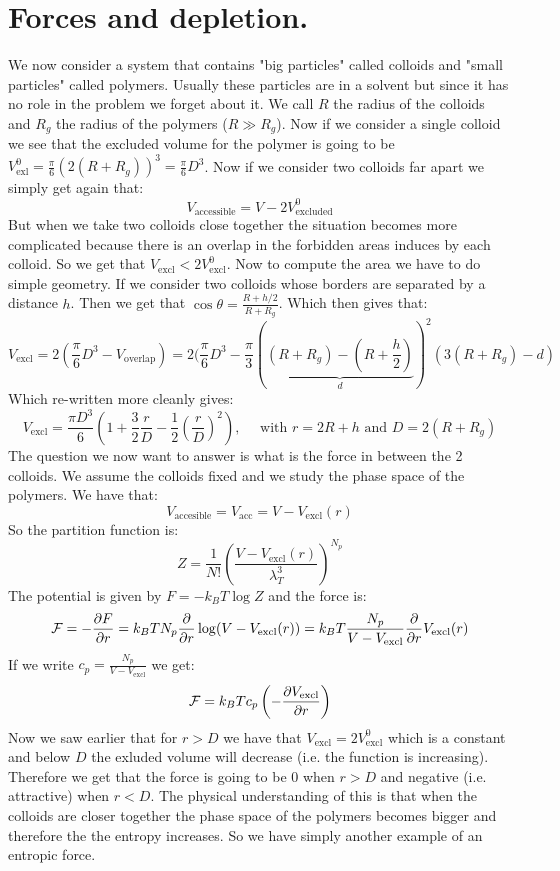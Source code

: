\documentclass[10pt,a4paper]{book}
\begin{document}
\section{Forces and depletion.}
We now consider a system that contains "big particles" called colloids and "small particles" called polymers. Usually these particles are in a solvent but since it has no role in the problem we forget about it. We call $R$ the radius of the colloids and $R_g$ the radius of the polymers ($R \gg R_g$). Now if we consider a single colloid we see that the excluded volume for the polymer is going to be $V_\text{exl}^0 = \frac{\pi}{6} \left(2(R + R_g)\right)^3 = \frac{\pi}{6} D^3$. Now if we consider two colloids far apart we simply get again that:
\[
V_\text{accessible} = V - 2 V_\text{excluded}^0
\]
But when we take two colloids close together the situation becomes more complicated because there is an overlap in the forbidden areas induces by each colloid. So we get that $V_\text{excl} < 2 V_\text{excl}^0$. Now to compute the area we have to do simple geometry. If we consider two colloids whose borders are separated by a distance $h$. Then we get that $\cos \theta = \frac{R + h/2}{R+ R_g}$. Which then gives that:
\[
V_\text{excl} = 2 (\frac{\pi}{6}D^3 - V_\text{overlap}) = 2 (\frac{\pi}{6}D^3 - \frac{\pi}{3} (\underbrace{(R + R_g) - (R + \frac{h}{2})}_{d})^2(3(R+ R_g) - d)
\]
Which re-written more cleanly gives:
\[
V_\text{excl} = \frac{\pi D^3}{6}\left( 1 + \frac{3}{2} \frac{r}{D} - \frac{1}{2} \left(\frac{r}{D}\right)^2\right), \quad \text{ with } r = 2R + h \text{ and } D = 2(R+R_g)
\]
The question we now want to answer is what is the force in between the 2 colloids. We assume the colloids fixed and we study the phase space of the polymers. We have that:
\[
V_\text{accesible} = V_\text{acc} = V - V_\text{excl} (r)
\]
So the partition function is:
\[
Z = \frac{1}{N!}\left(\frac{V - V_\text{excl}(r)}{\lambda_T^3}\right)^{N_p}
\]
The potential is given by $F = -k_B T \log Z$ and the force is:
\[
\mathcal{F} = -\pdv{F}{r} = k_B T N_p \pdv{}{r} \log(V - V_\text{excl}(r)) = k_B T \frac{N_p}{V - V_\text{excl}} \pdv{}{r} V_\text{excl}(r)
\]
If we write $c_p = \frac{N_p}{V - V_\text{excl}}$ we get:
\[
\mathcal{F} = k_B T c_p \left(-\pdv{V_\text{excl}}{r}\right)
\]
Now we saw earlier that for $r > D$ we have that $V_\text{excl} = 2V_\text{excl}^0$ which is a constant and below $D$ the exluded volume will decrease (i.e. the function is increasing). Therefore we get that the force is going to be 0 when $r > D$ and negative (i.e. attractive) when $r < D$. The physical understanding of this is that when the colloids are closer together the phase space of the polymers becomes bigger and therefore the the entropy increases. So we have simply another example of an entropic force.
\end{document}
